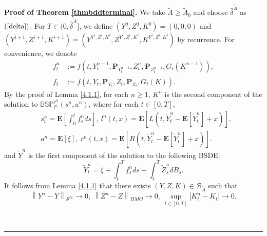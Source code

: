 \documentclass[10pt]{article}%
\numberwithin{equation}{section}
\newenvironment{proof}[1][Proof]{\noindent \textbf{#1.} }{\  \rule{0.5em}{0.5em}}
\def \E{\mathbf{E}}
\begin{document}
\begin{proof}[Proof of Theorem \ref{thmbddterminal}] We take $\tilde{A}\geq \tilde{A}_0$ and choose $\hat{\delta}^{\tilde{A}}$ as $(\ref{delta})$. For $T\in(0,\hat{\delta}^{\tilde{A}}]$, we define $(Y^0,Z^0,K^0)=(0,0,0)$ and $(Y^{i+1},Z^{i+1},K^{i+1})=(Y^{Y^{i},Z^{i},K^{i}},Z^{Y^{i},Z^{i},K^{i}},K^{Y^{i},Z^{i},K^{i}})$ by recurrence. 
For convenience, we denote 
$$
\begin{aligned}
  f^n_t&:=f(t,Y^{n-1}_{t},\mathbf{P}_{Y^{n-1}_{t}},Z_t^{n},\mathbf{P}_{Z_t^{n-1}},G_{t}(K^{n-1})),\\
  f_t&:=f(t,Y_{t},\mathbf{P}_{Y_{t}},Z_t,\mathbf{P}_{Z_t},G_{t}(K)).
\end{aligned}
$$
By the proof of Lemma \ref{4.1.1}, for each $n\geq 1$, $K^n$ is the second component of the solution to $\mathbb{BSP}^{r^n}_{l^n}(s^n,a^n)$, where for each $t\in[0,T]$,
\begin{equation}\label{sarln}\begin{split}
& s_t^{n}=\mathbf{E}\left[\int_{0}^{t} f_s^n ds\right],\ l^n(t,x)=\E\left[L(t,\widetilde{Y}^n_t-\E[\widetilde{Y}^n_t]+x)\right],\\
& a^n=\mathbf{E}[\xi], \ r^n(t,x)=\E\left[R(t,\widetilde{Y}^n_t-\E[\widetilde{Y}^n_t]+x)\right]. \end{split}
 \end{equation}
and $\widetilde{Y}^n$ is the first component of the solution to  the following BSDE:
\begin{equation*}
\widetilde{Y}^n_t=\xi+\int_{t}^{T} f_s^nds-\int_{t}^{T}\widetilde{Z}^n_s dB_s.    
\end{equation*}
It follows from Lemma \ref{4.1.1} that there exists $(Y,Z,K)\in \mathscr{B}_{\tilde{A}}$ such that %
\begin{equation}\label{YnY}
\left\|Y^n-Y\right\|_{\mathcal{S}^{\infty}}\to 0,\ \left\|Z^n-Z\right\|_{BMO}\to 0,\ \sup_{t\in[0,T]}|K_t^n-K_t|\to 0.    
\end{equation}


\end{proof}
\end{document}
